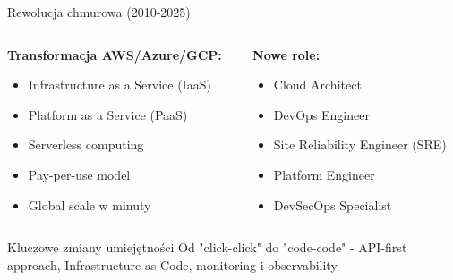 \documentclass[10pt, aspectratio=169]{beamer}
\begin{document}
\begin{frame}{Rewolucja chmurowa (2010-2025)}
\begin{columns}[T]
\begin{column}{0.5\textwidth}
\textbf{Transformacja AWS/Azure/GCP:}
\begin{itemize}
\item Infrastructure as a Service (IaaS)
\item Platform as a Service (PaaS)  
\item Serverless computing
\item Pay-per-use model
\item Global scale w minuty
\end{itemize}
\end{column}
\begin{column}{0.5\textwidth}
\textbf{Nowe role:}
\begin{itemize}
\item Cloud Architect
\item DevOps Engineer
\item Site Reliability Engineer (SRE)
\item Platform Engineer
\item DevSecOps Specialist
\end{itemize}
\end{column}
\end{columns}

\begin{exampleblock}{Kluczowe zmiany umiejętności}
Od "click-click" do "code-code" - API-first approach, Infrastructure as Code, monitoring i observability
\end{exampleblock}
\end{frame}
\end{document}

